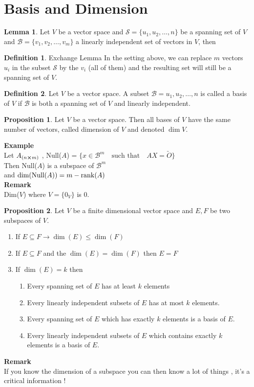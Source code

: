 \documentclass[
12pt,
]{article}
\newcommand{\ex}{\textbf{Example}}
\newcommand{\un}{u_1 , u_2 , \dots , n}
\theoremstyle{definition}
\theoremstyle{definition}
\newtheorem{lemma}[theorem]{Lemma}
\theoremstyle{definition}
\newtheorem{Definition}{Definition}[section]
\theoremstyle{definition}
\newtheorem{Proposition}{Proposition}[section]
\begin{document}
\section{Basis and Dimension}
\begin{lemma}
Let $V$ be a vector space and $\mathcal{S} = \{\un\}$ be a spanning set of $V$ and $\mathcal{B} = \{v_1 , v_2 , \dots , v_m\}$ a linearly independent set of vectors in $V$, then 
\begin{center}
\end{center}
\end{lemma}
\begin{Definition}{Exchange Lemma}
	In the setting above, we can replace $m$ vectors $u_i$ in the subset $\mathcal{S}$ by the $v_i$ (all of them) and the resulting set will still be a spanning set of $V$.
\end{Definition}
\begin{Definition}
	Let $V$ be a vector space. A subset $\mathcal{B} = \un$ is called a basis of $V$ if $\mathcal{B}$ is both a spanning set of $V$ and linearly independent. 
\end{Definition}
\begin{Proposition}
	Let $V$ be a vector space. Then all bases of $V$ have the same number of vectors, called dimension of $V$ and denoted $\dim V$.
\end{Proposition}
\ex \\
Let $A_{(n\cross m)}$ , \quad Null($A$) = $ \{x\in \mathcal{B}^m \quad \text{such that} \quad AX = \utilde{O}\}$ \\
Then Null($A$) is a subspace of $\mathcal{B}^m$ \\
and $\dim(\text{Null}(A)) = m -\rank (A)$ \\
\textbf{Remark} \\
Dim($V$) where $V=\{0_V\}$ is 0. \\
\begin{Proposition}
	Let $V$ be a finite dimensional vector space and $E,F$ be two subspaces of $V$.
	\begin{enumerate}
		\item If $E \subseteq F \xrightarrow{} \dim(E) \leq \dim(F)$
		\item If $E \subseteq F$ and the $\dim(E) = \dim(F)$ then $E=F$
		\item If $\dim(E) = k$ then 
		\begin{enumerate}
			\item Every spanning set of $E$ has at least $k$ elements 
			\item Every linearly independent subsets of $E$ has at most $k$ elements.
			\item Every spanning set of $E$ which has exactly $k$ elements is a basis of $E$.
			\item Every linearly independent subsets of $E$ which contains exactly $k$ elements is a basis of $E$.
		\end{enumerate}
	\end{enumerate}
\end{Proposition} 
\textbf{Remark} \\
If you know the dimension of a subspace you can then know a lot of things , it's a critical information !
\end{document}
